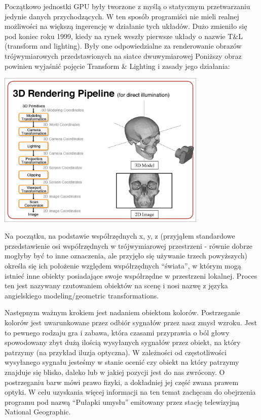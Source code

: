 \documentclass{article}
\begin{document}
\par
Początkowo jednostki GPU były tworzone z myślą o statycznym przetwarzaniu jedynie danych przychodzących. W ten sposób programiści nie mieli realnej możliwości na większą ingerencję w działanie tych układów. Dużo zmieniło się pod koniec roku 1999, kiedy na rynek weszły pierwsze układy o nazwie T&L (transform and lighting)\cite{ref13}. Były one odpowiedzialne za renderowanie obrazów trójwymiarowych przedstawionych na siatce dwuwymiarowej Poniższy obraz powinien wyjaśnić pojęcie Transform & Lighting i zasady jego działania:
\begin{center}
	\includegraphics[width=10cm]{tandl}
\end{center}
\par
Na początku, na podstawie współrzędnych x, y, z (przyjąłem standardowe przedstawienie osi współrzędnych w trójwymiarowej przestrzeni - równie dobrze mogłyby być to inne oznaczenia, ale przyjęło się używanie trzech powyższych) określa się ich położenie względem współrzędnych “świata”, w którym mogą istnieć inne obiekty posiadające swoje współrzędne w przestrzeni lokalnej. Proces ten jest nazywany rzutowaniem obiektów na scenę i nosi nazwę z języka angielskiego modeling/geometric transformations.
\par
Następnym ważnym krokiem jest nadaniem obiektom kolorów. Postrzeganie kolorów jest uwarunkowane przez odbiór sygnałów przez nasz zmysł wzroku. Jest to pewnego rodzaju gra i zabawa, która czasami przyprawia o ból głowy spowodowany zbyt dużą ilością wysyłanych sygnałów przez obiekt, na który patrzymy (na przykład iluzja optyczna). W zależności od częstotliwości wysyłanego sygnału jesteśmy w stanie ocenić czy obiekt na który patrzymy znajduje się blisko, daleko lub w jakiej pozycji jest do nas zwrócony. O postrzeganiu barw mówi prawo fizyki, a dokładniej jej część zwana prawem optyki. W celu uzyskania więcej informacji na ten temat zachęcam do obejrzenia programu pod nazwą “Pułapki umysłu” emitowany przez stację telewizyjną National Geographic.
\end{document}
